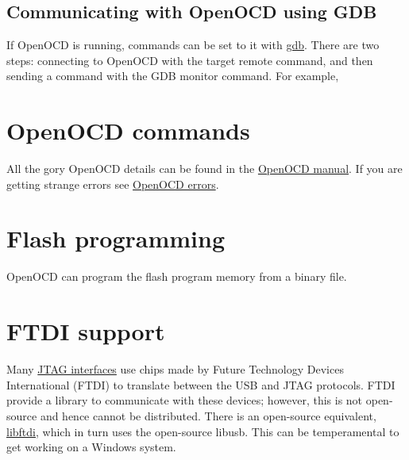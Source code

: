 \subsection{Communicating with OpenOCD using GDB}
\label{communicating-with-openocd-using-gdb}

If OpenOCD is running, commands can be set to it with \url{gdb}. There
are two steps: connecting to OpenOCD with the target remote command, and
then sending a command with the GDB monitor command. For example,

\begin{Shaded}
\begin{Highlighting}[]
\NormalTok{$ }
\KeywordTok{(}\KeywordTok{)} 
\KeywordTok{(}\KeywordTok{)} 
\end{Highlighting}
\end{Shaded}

\section{OpenOCD commands}
\label{openocd-commands}

All the gory OpenOCD details can be found in the
\href{Media:openocd.pdf}{OpenOCD manual}. If you are getting strange
errors see \href{OpenOCD_errors}{OpenOCD errors}.

\section{Flash programming}
\label{flash-programming}

OpenOCD can program the flash program memory from a binary file.

\section{FTDI support}
\label{ftdi-support}

Many \href{JTAG_interface}{JTAG interfaces} use chips made by Future
Technology Devices International (FTDI) to translate between the USB and
JTAG protocols. FTDI provide a library to communicate with these
devices; however, this is not open-source and hence cannot be
distributed. There is an open-source equivalent,
\href{http://freshmeat.net/projects/libftdi/}{libftdi}, which in turn
uses the open-source libusb. This can be temperamental to get working on
a Windows system.

